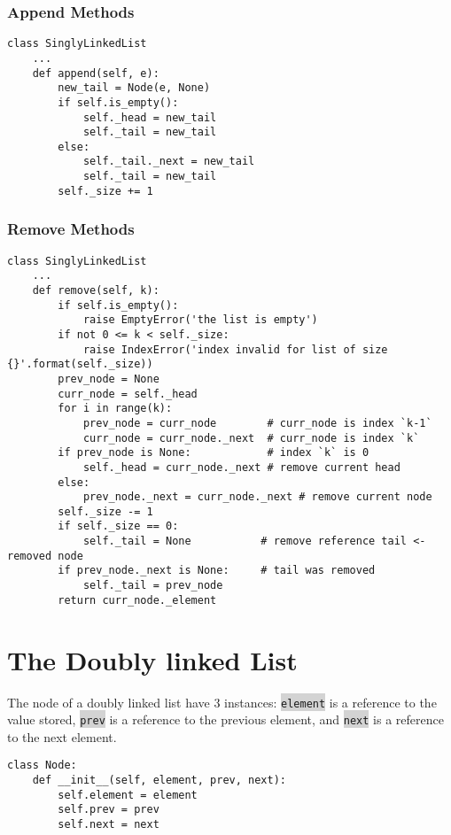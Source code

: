 \documentclass[10pt]{article}
\newcommand{\code}[1]{{\small\colorbox{LightGray}{\texttt{#1}}}}
\begin{document}
\subsubsection{Append Methods}
\begin{verbatim}
class SinglyLinkedList
    ...
    def append(self, e):
        new_tail = Node(e, None)
        if self.is_empty():
            self._head = new_tail
            self._tail = new_tail
        else:
            self._tail._next = new_tail
            self._tail = new_tail
        self._size += 1
\end{verbatim}
\subsubsection{Remove Methods}
\begin{verbatim}
class SinglyLinkedList
    ...
    def remove(self, k):
        if self.is_empty():
            raise EmptyError('the list is empty')
        if not 0 <= k < self._size:
            raise IndexError('index invalid for list of size {}'.format(self._size))
        prev_node = None
        curr_node = self._head
        for i in range(k):
            prev_node = curr_node        # curr_node is index `k-1`
            curr_node = curr_node._next  # curr_node is index `k`
        if prev_node is None:            # index `k` is 0
            self._head = curr_node._next # remove current head
        else:
            prev_node._next = curr_node._next # remove current node
        self._size -= 1
        if self._size == 0:             
            self._tail = None           # remove reference tail <- removed node 
        if prev_node._next is None:     # tail was removed	
            self._tail = prev_node
        return curr_node._element
\end{verbatim}

\section{The Doubly linked List}

The node of a doubly linked list have 3 instances: \code{element} is a reference to the value stored, \code{prev} is a reference to the previous element, and \code{next} is a reference to the next element. 
\begin{verbatim}
class Node:
    def __init__(self, element, prev, next):
        self.element = element
        self.prev = prev
        self.next = next
\end{verbatim}
\end{document}
